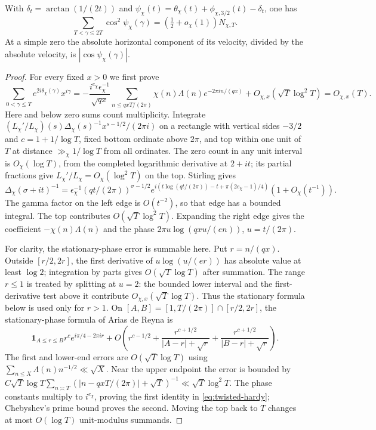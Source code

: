 \begin{lemma}\label{lem:mixed-phase}
With $\delta_t=\arctan(1/(2t))$ and
$\psi_\chi(t)=\theta_\chi(t)+\phi_{\chi,3/2}(t)-\delta_t$, one has
\[
 \sum_{T<\gamma\le2T}\cos^2\psi_\chi(\gamma)
       =(\tfrac12+o_\chi(1))N_{\chi,T}.
\]
At a simple zero the absolute horizontal component of its velocity,
divided by the absolute velocity, is $|\cos\psi_\chi(\gamma)|$.
\end{lemma}

\begin{proof}
For every fixed $x>0$ we first prove
\begin{equation}\label{eq:twisted-hardy}
 \sum_{0<\gamma\le T}e^{2i\theta_\chi(\gamma)}x^{i\gamma}
 =-\frac{i^{e_\chi}\epsilon_\chi^{-1}}{\sqrt{qx}}
       \sum_{n\le qxT/(2\pi)}\chi(n)\Lambda(n)e^{-2\pi in/(qx)}
       +O_{\chi,x}(\sqrt T\log^2T)=O_{\chi,x}(T).
\end{equation}
Here and below zero sums count multiplicity. Integrate
$(L_\chi'/L_\chi)(s)\Delta_\chi(s)^{-1}x^{s-1/2}/(2\pi i)$
on a rectangle with vertical sides $-3/2$ and $c=1+1/\log T$,
fixed bottom ordinate above $2\pi$, and top within one unit of $T$
at distance $\gg_\chi1/\log T$ from all ordinates. The zero count in
any unit interval is $O_\chi(\log T)$, from the completed logarithmic
derivative at $2+it$; its partial fractions give
$L_\chi'/L_\chi=O_\chi(\log^2T)$ on the top. Stirling gives
\[
 \Delta_\chi(\sigma+it)^{-1}
 =\epsilon_\chi^{-1}(qt/(2\pi))^{\sigma-1/2}
 e^{i(t\log(qt/(2\pi))-t+\pi(2e_\chi-1)/4)}(1+O_\chi(t^{-1})).
\]
The gamma factor on the left edge is $O(t^{-2})$, so that edge
has a bounded integral. The top contributes $O(\sqrt T\log^2T)$.
Expanding the right edge gives the coefficient $-\chi(n)\Lambda(n)$ and the phase
$2\pi u\log(qxu/(en))$, $u=t/(2\pi)$.

For clarity, the stationary-phase error is summable here. Put
$r=n/(qx)$. Outside $[r/2,2r]$, the first derivative of
$u\log(u/(er))$ has absolute value at least $\log2$;
integration by parts gives $O(\sqrt T\log T)$ after summation.
The range $r\le1$ is treated by splitting at $u=2$: the bounded
lower interval and the first-derivative test above it contribute
$O_{\chi,x}(\sqrt T\log T)$. Thus the stationary formula below is
used only for $r>1$.
On $[A,B]=[1,T/(2\pi)]\cap[r/2,2r]$, the stationary-phase
formula of Arias de Reyna \cite[Lemmas~2.2 and~2.5, p.~5]{arias}
is
\[
 \mathbf1_{A\le r\le B}r^c e^{i\pi/4-2\pi ir}
 +O\left(r^{c-1/2}+
 \frac{r^{c+1/2}}{|A-r|+\sqrt r}+
 \frac{r^{c+1/2}}{|B-r|+\sqrt r}\right).
\]
The first and lower-end errors are $O(\sqrt T\log T)$ using
$\sum_{n\le X}\Lambda(n)n^{-1/2}\ll\sqrt X$. Near the upper
endpoint the error is bounded by
$C\sqrt T\log T\sum_{n\asymp T}(|n-qxT/(2\pi)|+\sqrt T)^{-1}
\ll\sqrt T\log^2T$.
The phase constants multiply to $i^{e_\chi}$, proving the first
identity in \eqref{eq:twisted-hardy}; Chebyshev's prime bound proves
the second. Moving the top back to $T$ changes at most $O(\log T)$
unit-modulus summands.


\end{proof}
